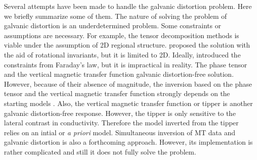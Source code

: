 	Several attempts have been made to handle the galvanic distortion problem. Here we briefly summarize some of them. The nature of solving the problem of galvanic distortion is an underdetermined problem. Some constraints or assumptions are necessary.
	For example, the tensor decomposition methods \citep[e.g.,][]{groom1989a, chave1994a, smith1995a, mcneice2001a} is viable under the assumption of 2D regional structure.
	\citet{gomez-trevino2014a} proposed the solution with the aid of rotational invariants, but it is limited to 2D.
	Ideally, \citet{utada2000a} introduced the constraints from Faraday's law, but it is impractical in reality.
	The phase tensor \citep{caldwell2004a} and the vertical magnetic transfer function galvanic distortion-free solution. However, because of their absence of magnitude, the inversion based on the phase tensor and the vertical magnetic transfer function strongly depends on the starting models \citep{siripunvaraporn2009a, patro2013a, tietze2015a}. 
	Also, the vertical magnetic transfer function or tipper is another galvanic distortion-free response.
	However, the tipper is only sensitive to the lateral contrast in conductivity. Therefore the model inverted from the tipper relies on an intial or \emph{a priori} model.
	Simultaneous inversion of MT data and galvanic distortion \citep[e.g.,][]{sasaki2006a, jones2011a, avdeeva2015a} is also a forthcoming approach. However, its implementation is rather complicated and still it does not fully solve the problem.



